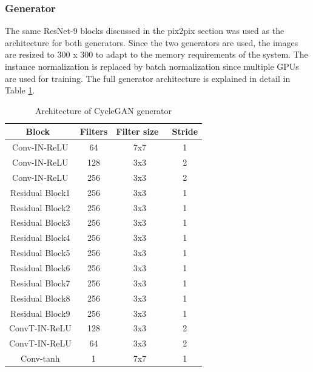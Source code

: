 \subsubsection*{Generator}
The same ResNet-9 blocks discussed in the pix2pix section was used as the architecture for both generators. Since the two generators are used, the images are resized to 300 x 300 to adapt to the memory requirements of the system. The instance normalization is replaced by batch normalization since multiple GPUs are used for training. The full generator architecture is explained in detail in Table \ref{tab:tab3}.

\begin{table}[H]
\centering
\begin{tabular}{|c|c|c|c|} 
\hline
\textbf{Block~} & \textbf{Filters} & \textbf{Filter size~} & \textbf{Stride}  \\ 
\hline
Conv-IN-ReLU    & 64               & 7x7                   & 1                \\ 
\hline
Conv-IN-ReLU    & 128              & 3x3                   & 2                \\ 
\hline
Conv-IN-ReLU    & 256              & 3x3                   & 2                \\ 
\hline
Residual Block1 & 256              & 3x3                   & 1                \\ 
\hline
Residual Block2 & 256              & 3x3                   & 1                \\ 
\hline
Residual Block3 & 256              & 3x3                   & 1                \\ 
\hline
Residual Block4 & 256              & 3x3                   & 1                \\ 
\hline
Residual Block5 & 256              & 3x3                   & 1                \\ 
\hline
Residual Block6 & 256              & 3x3                   & 1                \\ 
\hline
Residual Block7 & 256              & 3x3                   & 1                \\ 
\hline
Residual Block8 & 256              & 3x3                   & 1                \\ 
\hline
Residual Block9 & 256              & 3x3                   & 1                \\ 
\hline
ConvT-IN-ReLU   & 128              & 3x3                   & 2                \\ 
\hline
ConvT-IN-ReLU   & 64               & 3x3                   & 2                \\ 
\hline
Conv-tanh       & 1                & 7x7                   & 1                \\
\hline
\end{tabular}
\caption{Architecture of CycleGAN generator}
\label{tab:tab3}
\end{table}

